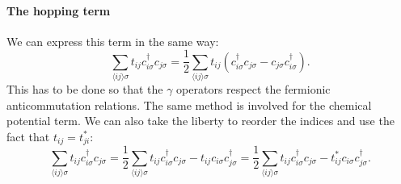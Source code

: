 \documentclass[../main.tex]{subfile}
\begin{document}
\paragraph{The hopping term} $~$\\
We can express this term in the same way:
\[
    \sum_{\langle ij\rangle\sigma} t_{ij} c_{i\sigma}^{\dagger} c_{j\sigma} = \frac{1}{2}\sum_{\langle ij\rangle \sigma} t_{ij} \left(c_{i\sigma}^{\dagger}c_{j\sigma} - c_{j\sigma}c_{i\sigma}^{\dagger}\right).
\]
This has to be done so that the $\gamma$ operators respect the fermionic anticommutation relations. The same method is involved for the chemical potential term.
We can also take the liberty to reorder the indices and use the fact that $t_{ij} = t_{ji}^{\ast}$:
\begin{equation}\label{eq:SymHam_tij}
    \sum_{\langle ij\rangle\sigma} t_{ij} c_{i\sigma}^{\dagger} c_{j\sigma} = \frac{1}{2}\sum_{\langle ij\rangle \sigma} t_{ij}c_{i\sigma}^{\dagger}c_{j\sigma} - t_{ij}c_{i\sigma}c_{j\sigma}^{\dagger} = \frac{1}{2}\sum_{\langle ij\rangle \sigma} t_{ij}c_{i\sigma}^{\dagger}c_{j\sigma} - t_{ij}^{\ast}c_{i\sigma}c_{j\sigma}^{\dagger}.
\end{equation}
\end{document}
